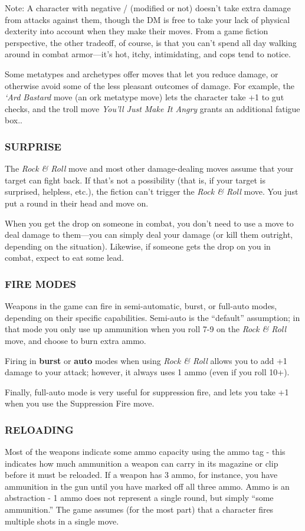 \documentclass[oneside,10pt]{article}
\begin{document}
\begin{multicols}{2}
Note: A character with negative \twitch/ (modified or not) doesn't
take extra damage from attacks against them, though the DM is free to
take your lack of physical dexterity into account when they make their
moves. From a game fiction perspective, the other tradeoff, of course,
is that you can’t spend all day walking around in combat armor—it’s
hot, itchy, intimidating, and cops tend to notice.

Some metatypes and archetypes offer moves that let you reduce damage,
or otherwise avoid some of the less pleasant outcomes of damage. For
example, the \textit{‘Ard Bastard} move (an ork metatype move) lets
the character take +1 to gut checks, and the troll move \textit{You’ll
  Just Make It Angry} grants an additional fatigue box..


\subsubsection{SURPRISE}
The \textit{Rock \& Roll} move and most other damage-dealing moves
assume that your target can fight back. If that’s not a possibility
(that is, if your target is surprised, helpless, etc.), the fiction
can’t trigger the \textit{Rock \& Roll} move. You just put a round in
their head and move on.

When you get the drop on someone in combat, you don’t need to use a
move to deal damage to them—you can simply deal your damage (or kill
them outright, depending on the situation). Likewise, if someone gets
the drop on you in combat, expect to eat some lead.


\subsubsection{FIRE MODES}
Weapons in the game can fire in semi-automatic, burst, or
full-auto modes, depending on their specific capabilities.
Semi-auto is the ``default'' assumption; in that mode you only
use up ammunition when you roll 7-9 on the \textit{Rock \& Roll}
move, and choose to burn extra ammo.

Firing in \textbf{burst} or \textbf{auto} modes when using
\textit{Rock \& Roll} allows you to add +1 damage to your attack;
however, it always uses 1 ammo (even if you roll 10+).

Finally, full-auto mode is very useful for suppression fire, and
lets you take +1 when you use the Suppression Fire move.


\subsubsection{RELOADING}
Most of the weapons indicate some ammo capacity using the ammo tag -
this indicates how much ammunition a weapon can carry in its magazine
or clip before it must be reloaded.  If a weapon has 3 ammo, for
instance, you have ammunition in the gun until you have marked off all
three ammo.  Ammo is an abstraction - 1 ammo does not represent a
single round, but simply ``some ammunition.'' The game assumes (for the
most part) that a character fires multiple shots in a single move.


\end{multicols}
\end{document}
